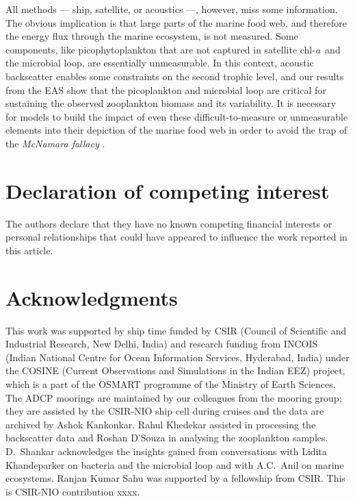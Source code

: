 \documentclass[authoryear,review,11pt]{elsarticle}
\newcommand{\chla}{chl-{\emph{a}}}
\begin{document}
All methods --- ship, satellite, or acoustics ---, however, miss some information.  The obvious implication is that large parts of the marine food web, and therefore the energy flux through the marine ecosystem, is not measured. Some components, like picophytoplankton that are not captured in satellite \chla\ and the microbial loop, are essentially unmeasurable. In this context, acoustic backscatter enables some constraints on the second trophic level, and our results from the EAS show that the picoplankton and microbial loop are critical for sustaining the observed zooplankton biomass and its variability. It is necessary for models to build the impact of even these difficult-to-measure or unmeasurable elements into their depiction of the marine food web in order to avoid the trap of the \emph{McNamara fallacy} \citep{yankelovich1971}.



\section*{Declaration of competing interest}

The authors declare that they have no known competing financial interests or personal relationships that could have appeared to influence the work reported in this article.

\section*{Acknowledgments} 

This work was supported by ship time funded by CSIR (Council of Scientific and Industrial Research, New Delhi, India) and research funding from INCOIS (Indian National Centre for Ocean Information Services, Hyderabad, India)  under the COSINE (Current Observations and Simulations in the Indian EEZ) project, which is a part of the OSMART programme of the Ministry of Earth Sciences. The ADCP moorings are maintained by our colleagues from the mooring group; they are assisted by the CSIR-NIO ship cell during cruises and the data are archived by Ashok Kankonkar. Rahul Khedekar assisted in processing the backscatter data and Roshan D'Souza in analysing the zooplankton samples. D.~Shankar acknowledges the insights gained from conversations with Lidita Khandeparker on bacteria and the microbial loop and with A.C.~Anil on marine ecosystems. Ranjan Kumar Sahu was supported by a fellowship from CSIR. This is CSIR-NIO contribution xxxx.
\end{document}
